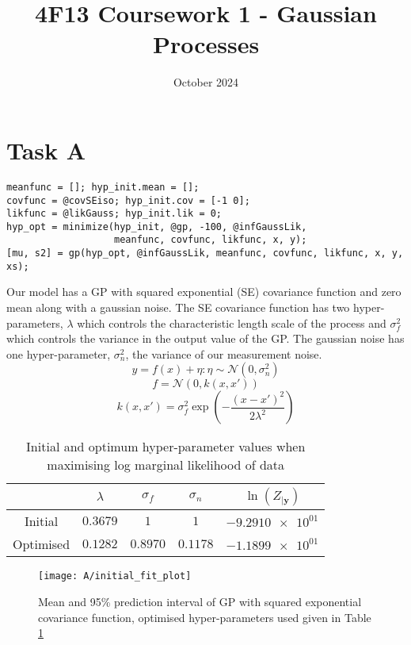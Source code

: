 \documentclass[11pt]{article}
\title{\vspace{-2cm}4F13 Coursework 1 - Gaussian Processes}
\author{}
\date{October 2024}
\begin{document}
\maketitle
\section{Task A}

\begin{lstlisting}[caption=Code to train hyper-parameters and generate the predictive distribution of a GP with squared exponential covariance, captionpos=b, basicstyle=\small]
meanfunc = []; hyp_init.mean = [];
covfunc = @covSEiso; hyp_init.cov = [-1 0];
likfunc = @likGauss; hyp_init.lik = 0;
hyp_opt = minimize(hyp_init, @gp, -100, @infGaussLik, 
                   meanfunc, covfunc, likfunc, x, y);
[mu, s2] = gp(hyp_opt, @infGaussLik, meanfunc, covfunc, likfunc, x, y, xs);
\end{lstlisting}


Our model has a GP with squared exponential (SE) covariance function and zero mean along with a gaussian noise. The SE covariance function has two hyper-parameters, $\lambda$ which controls the characteristic length scale of the process and $\sigma_f^2$ which controls the variance in the output value of the GP. The gaussian noise has one hyper-parameter, $\sigma_n^2$, the variance of our measurement noise. 
\[y = f(x) + \eta : \eta \sim \mathcal{N}(0, \sigma_n^2)\]
\[f = \mathcal{N}(0, k(x, x'))\]
\[k(x,x') = \sigma_f^2 \exp(-\frac{(x-x')^2}{2\lambda^2})\]

\begin{table}[h]
    \centering
    \begin{tabular}{|c|c|c|c|c|}
        \hline
         & $\lambda$ & $\sigma_f$ & $\sigma_n$ & $\ln(Z_{|\textbf{y}})$ \\
        \hline
        Initial & $0.3679$ & $1$ & $1$ & $\num{-9.2910e+01}$ \\ 
        Optimised & $0.1282$ & $0.8970$ & $0.1178$ & $\num{-1.1899e+01}$ \\ 
        \hline
    \end{tabular}
    \caption{Initial and optimum hyper-parameter values when maximising log marginal likelihood of data}
    \label{table:A_hyper_parameters}
\end{table}

\begin{figure}[h]
    \centering
    \texttt{[image: A/initial\_fit\_plot]}
    \caption{Mean and 95\% prediction interval of GP with squared exponential covariance function, optimised hyper-parameters used given in Table \ref{table:A_hyper_parameters}}
    \label{fig:A}
\end{figure}
\end{document}
